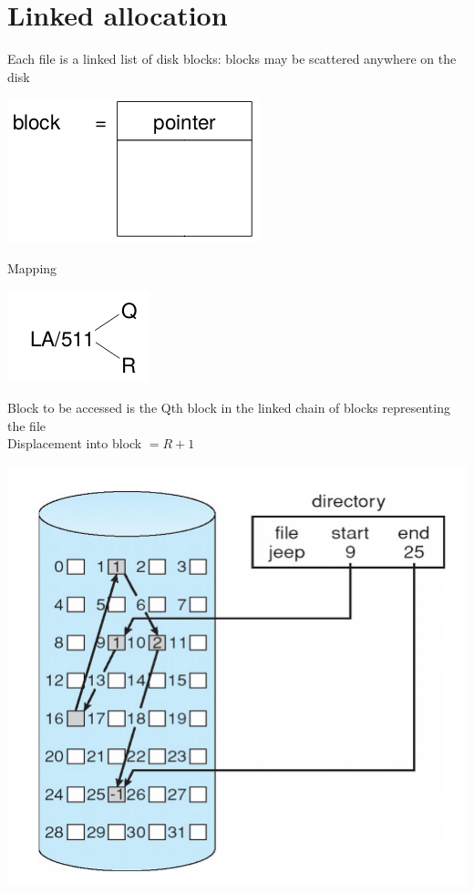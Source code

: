 \documentclass{article}[18pt]
\begin{document}
\section{Linked allocation}
Each file is a linked list of disk blocks: blocks may be scattered anywhere on the disk
\begin{center}
	\includegraphics[scale=0.7]{Linked}
\end{center}
Mapping
\begin{center}
	\includegraphics[scale=0.7]{Linked1}
\end{center}
Block to be accessed is the Qth block in the linked chain of blocks representing the file\\
Displacement into block $=R+1$
\begin{center}
	\includegraphics[scale=0.7]{Linked2}
\end{center}
\end{document}
